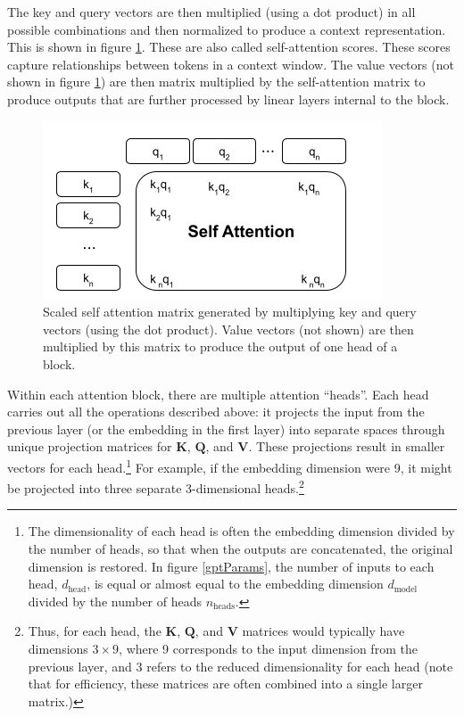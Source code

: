 The key and query vectors are then multiplied (using a dot product) in all possible combinations and then normalized to produce a context representation. This is shown in figure \ref{selfAttention}. These are also called self-attention scores. These scores capture relationships between tokens in a context window. The value vectors (not shown in figure \ref{selfAttention}) are then matrix multiplied by the self-attention matrix to produce outputs that are further processed by linear layers internal to the block.

\begin{figure}[h]
\centering
\includegraphics[scale=.6]{./images/selfAttention.png}
\caption[Jeff Yoshimi with consultation from Tim Meyer.]{Scaled self attention matrix generated by multiplying key and query vectors (using the dot product). Value vectors (not shown) are then multiplied by this matrix to produce the output of one head of a block.}
\label{selfAttention}
\end{figure}

Within each attention block, there are multiple attention ``heads''. Each head carries out all the operations described above: it projects the input from the previous layer (or the embedding in the first layer) into separate spaces through unique projection matrices for $\textbf{K}$, $\textbf{Q}$, and $\textbf{V}$. These projections result in smaller vectors for each head.\footnote{The dimensionality of each head is often the embedding dimension divided by the number of heads, so that when the outputs are concatenated, the original dimension is restored. In figure \ref{gptParams}, the number of inputs to each head, $d_\text{head}$, is equal or almost equal to the embedding dimension $d_\text{model}$ divided by the number of heads $n_\text{heads}$.} For example, if the embedding dimension were 9, it might be projected into three separate 3-dimensional heads.\footnote{Thus, for each head, the $\textbf{K}$, $\textbf{Q}$, and $\textbf{V}$ matrices would typically have dimensions $3 \times 9$, where 9 corresponds to the input dimension from the previous layer, and 3 refers to the reduced dimensionality for each head (note that for efficiency, these matrices are often combined into a single larger matrix.)}

